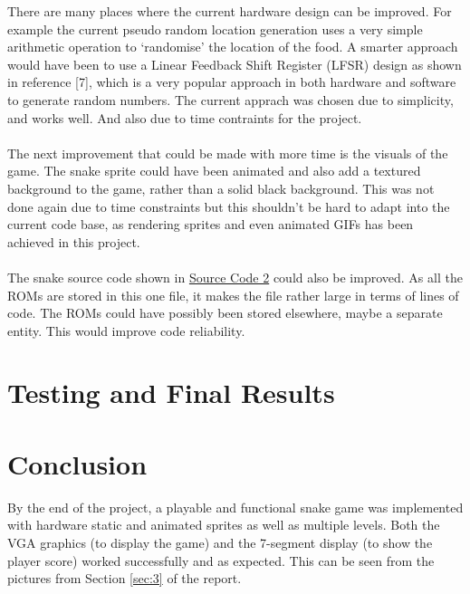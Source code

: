 \documentclass[aps, secnumarabic, balancelastpage, asmath, amssymb, nofootinbib, floatfix,]{revtex4-2}
\begin{document}
{There are many places where the current hardware design can be improved. For example the current pseudo random location generation uses a very simple arithmetic operation to `randomise' the location of the food. A smarter approach would have been to use a Linear Feedback Shift Register (LFSR) design as shown in reference [7], which is a very popular approach in both hardware and software to generate random numbers. The current apprach was chosen due to simplicity, and works well. And also due to time contraints for the project. ~\\
~\\
The next improvement that could be made with more time is the visuals of the game. The snake sprite could have been animated and also add a textured background to the game, rather than a solid black background. This was not done again due to time constraints but this shouldn't be hard to adapt into the current code base, as rendering sprites and even animated GIFs has been achieved in this project. ~\\
~\\
The snake source code shown in \hyperref[code:snake]{Source Code 2} could also be improved. As all the ROMs are stored in this one file, it makes the file rather large in terms of lines of code. The ROMs could have possibly been stored elsewhere, maybe a separate entity. This would improve code reliability.

\clearpage


\section{\fontsize{11.3pt}{12pt}\selectfont \bf Testing and Final Results}
\fontsize{11pt}{12pt}\selectfont \label{sec:3}








\clearpage






\section{\fontsize{11.3pt}{12pt}\selectfont \bf Conclusion}
\fontsize{11pt}{12pt}\selectfont \label{sec:4}


By the end of the project, a playable and functional snake game was implemented with hardware static and animated sprites as well as multiple levels. Both the VGA graphics (to display the game) and the 7-segment display (to show the player score) worked successfully and as expected. This can be seen from the pictures from Section \ref{sec:3} of the report.~\\
~\\

}
\end{document}
